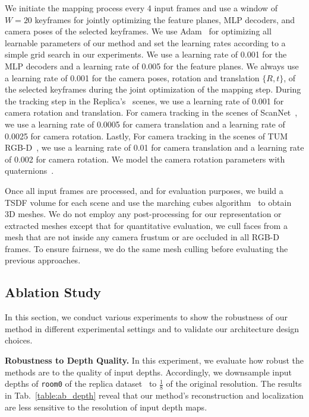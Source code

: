 We initiate the mapping process every 4 input frames and use a window of $W=20$ keyframes for jointly optimizing the feature planes, MLP decoders, and camera poses of the selected keyframes. We use Adam~\cite{adam} for optimizing all learnable parameters of our method and set the learning rates according to a simple grid search in our experiments. We use a learning rate of 0.001 for the MLP decoders and a learning rate of 0.005 for the feature planes. We always use a learning rate of 0.001 for the camera poses, \ie rotation and translation $\{R,t\}$, of the selected keyframes during the joint optimization of the mapping step. During the tracking step in the Replica's~\cite{replica19arxiv} scenes, we use a learning rate of 0.001 for camera rotation and translation. For camera tracking in the scenes of ScanNet~\cite{dai2017scannet}, we use a learning rate of 0.0005 for camera translation and a learning rate of 0.0025 for camera rotation. Lastly, For camera tracking in the scenes of TUM RGB-D~\cite{sturm2012benchmark}, we use a learning rate of 0.01 for camera translation and a learning rate of 0.002 for camera rotation. We model the camera rotation parameters with quaternions~\cite{shoemake1985animating}.

Once all input frames are processed, and for evaluation purposes, we build a TSDF volume for each scene and use the marching cubes algorithm~\cite{lorensen1987marching} to obtain 3D meshes. We do not employ any post-processing for our representation or extracted meshes except that for quantitative evaluation, we cull faces from a mesh that are not inside any camera frustum or are occluded in all RGB-D frames. To ensure fairness, we do the same mesh culling before evaluating the previous approaches.

\subsection{Ablation Study} \label{sec:c4_ablation}

In this section, we conduct various experiments to show the robustness of our method in different experimental settings and to validate our architecture design choices.

\vspace{1ex}
\noindent\textbf{Robustness to Depth Quality.} In this experiment, we evaluate how robust the methods are to the quality of input depths. Accordingly, we downsample input depths of \texttt{room0} of the replica dataset~\cite{replica19arxiv} to $\frac{1}{8}$ of the original resolution. The results in Tab.~\ref{table:ab_depth} reveal that our method's reconstruction and localization are less sensitive to the resolution of input depth maps.

